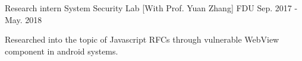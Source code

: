 \begin{cventries}
  \cventry
    {Research intern} %
    {System Security Lab [With Prof. Yuan Zhang]} %
    {FDU} %
    {Sep. 2017 - May. 2018} %
    {
      \begin{cvitems} %
        \item {Researched into the topic of Javascript RFCs through vulnerable WebView component in android systems.}
      \end{cvitems}
    }

\end{cventries}

